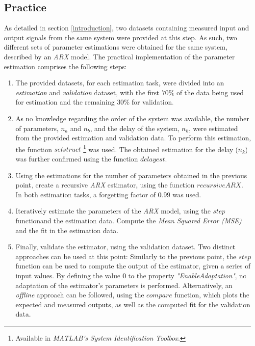 \documentclass[12pt]{article}
\begin{document}
\subsection{Practice}
\label{parameter_estimation_arx}

As detailed in section \ref{introduction}, two datasets containing measured input and output signals from the same system were provided at this step. As such, two different sets of parameter estimations were obtained for the same system, described by an \emph{ARX} model. The practical implementation of the parameter estimation comprises the following steps:

\begin{enumerate}
	\item The provided datasets, for each estimation task, were divided into an \emph{estimation} and \emph{validation} dataset, with the first $70\%$ of the data being used for estimation and the remaining $30\%$ for validation.
	
	\item As no knowledge regarding the order of the system was available, the number of parameters, $n_{a}$ and $n_{b}$, and the delay of the system, $n_{k}$, were estimated from the provided estimation and validation data. To perform this estimation, the function $selstruct$ \footnote{Available in \emph{MATLAB's System Identification Toolbox}.} was used. The obtained estimation for the delay ($n_{k}$) was further confirmed using the function $delayest$\footnotemark[\value{footnote}].
	
	\item Using the estimations for the number of parameters obtained in the previous point, create a recursive \emph{ARX} estimator, using the function $recursiveARX$\footnotemark[\value{footnote}]. In both estimation tasks, a forgetting factor of $0.99$ was used.
	
	\item Iteratively estimate the parameters of the \emph{ARX} model, using the $step$ function\footnotemark[\value{footnote}] and the estimation data. Compute the \emph{Mean Squared Error (MSE)} and the fit in the estimation data.
	
	\item Finally, validate the estimator, using the validation dataset. Two distinct approaches can be used at this point: Similarly to the previous point, the $step$ function can be used to compute the output of the estimator, given a series of input values. By defining the value $0$ to the property \emph{"EnableAdaptation"}, no adaptation of the estimator's parameters is performed. Alternatively, an \emph{offline} approach can be followed, using the $compare$ function\footnotemark[\value{footnote}], which plots the expected and measured outputs, as well as the computed fit for the validation data. 
\end{enumerate}
\end{document}

